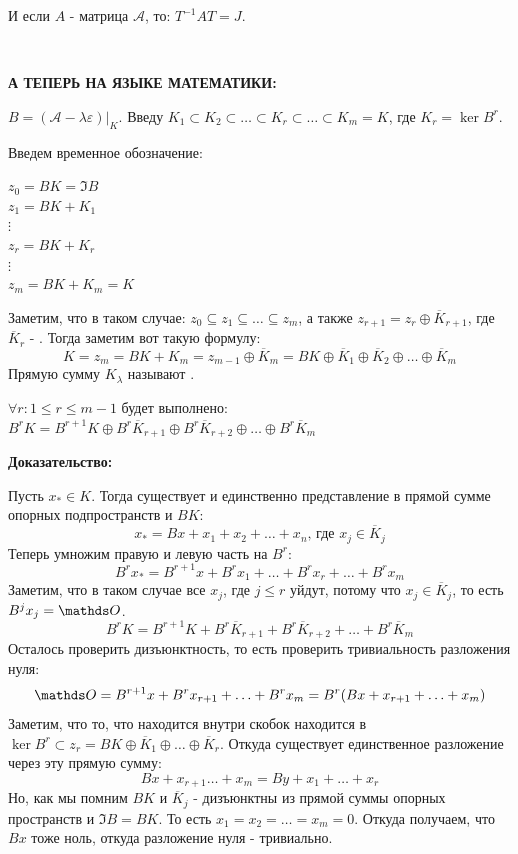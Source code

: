 И если $A$ - матрица $\mathcal{A}$, то: $T^{-1}AT=J$.

\,

\textbf{А ТЕПЕРЬ НА ЯЗЫКЕ МАТЕМАТИКИ:}

$B = (\mathcal{A}-\lambda\varepsilon)\Big|_{K}$.
Введу $K_1 \subset K_2 \subset \ldots \subset K_r \subset \ldots \subset K_m = K$, где $K_r = \ker B^r$.

Введем временное обозначение:

$z_0 = BK = \Im B$\\
$z_1 = BK + K_1$\\
$\vdots$\\
$z_r = BK + K_r$\\
$\vdots$\\
$z_m = BK + K_m = K$

Заметим, что в таком случае: $z_0 \subseteq z_1 \subseteq \ldots \subseteq z_m $, а также $z_{r+1}= z_r \oplus \overline{K}_{r+1}$, где $\overline{K}_r$ - . Тогда заметим вот такую формулу:
$$K = z_m= BK+K_m  = z_{m-1} \oplus \overline{K}_m = BK \oplus\overline{K}_1 \oplus \overline{K}_2 \oplus \ldots \oplus \overline{K}_m$$
Прямую сумму $K_{\lambda}$ называют .


$\forall r: 1\leq r \leq m-1$ будет выполнено: $B^rK = B^{r+1}K \oplus B^r \overline{K}_{r+1}\oplus B^r \overline{K}_{r+2}\oplus\ldots\oplus B^r \overline{K}_m$

\textbf{Доказательство:}

Пусть $x_{*} \in K$. Тогда существует и единственно представление в прямой сумме опорных подпространств и $BK$:
$$x_{*} = Bx + x_1 + x_2 +\ldots +x_n\text{, где }x_j \in \overline{K}_{j}$$
Теперь умножим правую и левую часть на $B^r$:
$$B^r x_*  = B^{r+1}x + B^r x_1 +\ldots + B^r x_r + \ldots + B^r x_m$$
Заметим, что в таком случае все $x_j$, где $j\leq r$ уйдут, потому что $x_j \in \overline{K}_j$, то есть $B^{j}x_j = \zero$.
$$B^rK = B^{r+1}K + B^r \overline{K}_{r+1}+ B^r \overline{K}_{r+2}+\ldots+ B^r \overline{K}_m$$
Осталось проверить дизъюнктность, то есть проверить тривиальность разложения нуля:
$$\zero = B^{r+1}x + B^{r}x_{r+1} + \ldots + B^r x_m = B^r(Bx + x_{r+1} + \ldots +x_m)$$
Заметим, что то, что находится внутри скобок находится в $\ker B^r\subset z_r = BK\oplus \overline{K}_1 \oplus\ldots\oplus \overline{K}_r$. Откуда существует единственное разложение через эту прямую сумму:
$$Bx + x_{r+1}\ldots +x_m = By + x_1 +\ldots + x_r$$
Но, как мы помним $BK$ и $\overline{K}_j$ - дизъюнктны из прямой суммы опорных пространств и $\Im B =BK$.  То есть $x_1=x_2 =\ldots = x_m =0$. Откуда получаем, что $Bx$ тоже ноль, откуда разложение нуля - тривиально.

